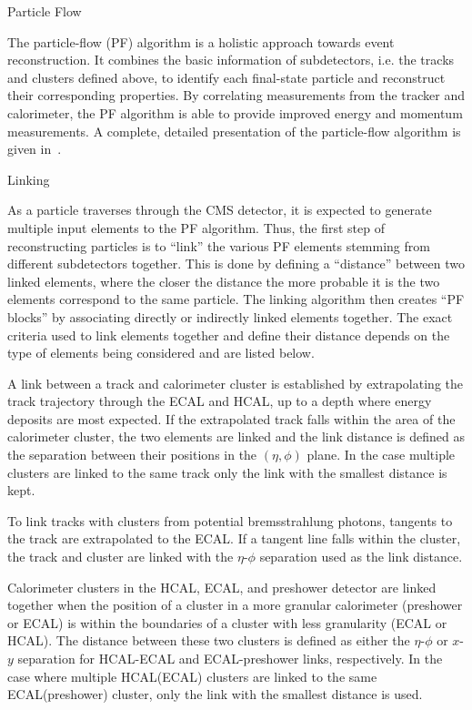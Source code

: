 \begin{section}{Particle Flow}

The particle-flow (PF) algorithm is a holistic approach towards event reconstruction.
It combines the basic information of subdetectors, i.e. the tracks and clusters defined above, to identify each final-state particle and reconstruct their corresponding properties.
By correlating measurements from the tracker and calorimeter, the PF algorithm is able to provide improved energy and momentum measurements. A complete, detailed presentation of the particle-flow algorithm is given in~\cite{1748-0221-12-10-P10003,CMS-PAS-PFT-09-001,CMS-PAS-PFT-10-001}.

\begin{subsection}{Linking}

As a particle traverses through the CMS detector, it is expected to generate multiple input elements to the PF algorithm.
Thus, the first step of reconstructing particles is to ``link'' the various PF elements stemming from different subdetectors together.
This is done by defining a ``distance'' between two linked elements, where the closer the distance the more probable it is the two elements correspond to the same particle.
The linking algorithm then creates ``PF blocks'' by associating directly or indirectly linked elements together.
The exact criteria used to link elements together and define their distance depends on the type of elements being considered and are listed below.

A link between a track and calorimeter cluster is established by extrapolating the track trajectory through the ECAL and HCAL, up to a depth where energy deposits are most expected.
If the extrapolated track falls within the area of the calorimeter cluster, the two elements are linked and the link distance is defined as the separation between their positions in the $(\eta,\phi)$ plane.
In the case multiple clusters are linked to the same track only the link with the smallest distance is kept.

To link tracks with clusters from potential bremsstrahlung photons, tangents to the track are extrapolated to the ECAL.
If a tangent line falls within the cluster, the track and cluster are linked with the $\eta$-$\phi$ separation used as the link distance.

Calorimeter clusters in the HCAL, ECAL, and preshower detector are linked together when the position of a cluster in a more granular calorimeter (preshower or ECAL) is within the boundaries of a cluster with less granularity (ECAL or HCAL).
The distance between these two clusters is defined as either the $\eta$-$\phi$ or $x$-$y$ separation for HCAL-ECAL and ECAL-preshower links, respectively.
In the case where multiple HCAL(ECAL) clusters are linked to the same ECAL(preshower) cluster, only the link with the smallest distance is used.


\end{subsection}
\end{section}
